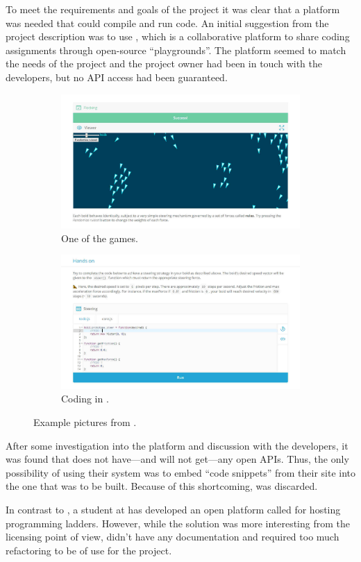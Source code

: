 To meet the requirements and goals of the project it was clear that a platform was needed that could compile and run code. An initial suggestion from the project description was to use \techio{}, which is a collaborative platform to share coding assignments through open-source ``playgrounds''. The platform seemed to match the needs of the project and the project owner had been in touch with the developers, but no API access had been guaranteed.
\begin{figure}[ht]
    \begin{subfigure}{.45\linewidth}
        \includegraphics[width=\linewidth]{img/techio_game.jpg}
        \caption{One of the games.}
    \end{subfigure}
    \hfill
    \begin{subfigure}{.45\linewidth}
        \includegraphics[width=\linewidth]{img/techio_handson.jpg}
        \caption{Coding in \techio.}
    \end{subfigure}
    \caption{Example pictures from \techio.}
\end{figure}

After some investigation into the platform and discussion with the developers, it was found that \techio{} does not have---and will not get---any open APIs. Thus, the only possibility of using their system was to  embed ``code snippets'' from their site into the one that was to be built. Because of this shortcoming, \techio{} was discarded.

In contrast to \techio{}, a student at \LTU{} has developed an open platform called \sockr{} for hosting programming ladders. However, while the solution was more interesting from the licensing point of view, \sockr{} didn't have any documentation and required too much refactoring to be of use for the project.
